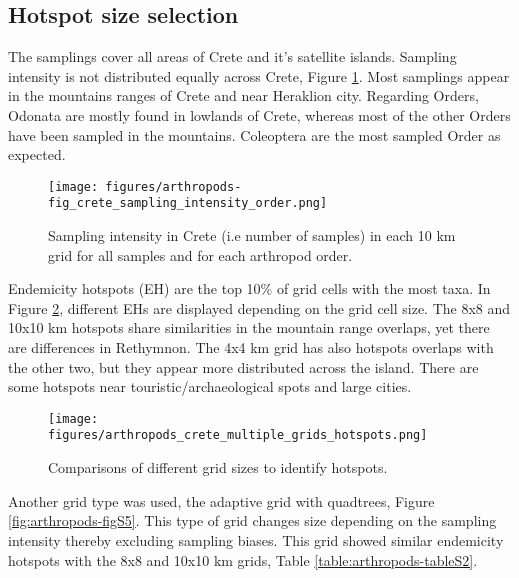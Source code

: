     \subsection{Hotspot size selection}
    \label{subsec:arthropods-grids}

The samplings cover all areas of Crete and it's satellite islands. 
Sampling intensity is not distributed equally across Crete, Figure \ref{fig:arthropods-sampling-intesity}.
Most samplings appear in the mountains ranges of Crete and near Heraklion city.
Regarding Orders, Odonata are mostly found in lowlands of Crete, whereas 
most of the other Orders have been sampled in the mountains. 
Coleoptera are the most sampled Order as expected. 


   \begin{figure}[htb!]
      \centering
      \texttt{[image: figures/arthropods-fig\_crete\_sampling\_intensity\_order.png]}
      \caption[Sampling intensity]{Sampling intensity in Crete (i.e number of samples) in each 10 km grid for all samples and for each arthropod order.}
      \label{fig:arthropods-sampling-intesity}
   \end{figure}

Endemicity hotspots (EH) are the top 10\% of grid cells with the most taxa. 
In Figure \ref{fig:arthropods-different-hotposts}, different EHs are 
displayed depending on the grid cell size. The 8x8 and 10x10 km 
hotspots share similarities in the mountain range overlaps, yet there 
are differences in Rethymnon. The 4x4 km grid has also hotspots overlaps 
with the other two, but they appear more distributed across the island. 
There are some hotspots near touristic/archaeological spots and large cities.


   \begin{figure}[htb!]
      \centering
      \texttt{[image: figures/arthropods\_crete\_multiple\_grids\_hotspots.png]}
      \caption[Comparisons of different grid sizes]{Comparisons of different grid sizes to identify hotspots.}
      \label{fig:arthropods-different-hotposts}
   \end{figure}
   
   Another grid type was used, the adaptive grid with quadtrees, Figure \ref{fig:arthropods-figS5}. This type of grid changes 
size depending on the sampling intensity thereby excluding sampling biases. This
grid showed similar endemicity hotspots with the 8x8 and 10x10 km grids, Table \ref{table:arthropods-tableS2}. 


